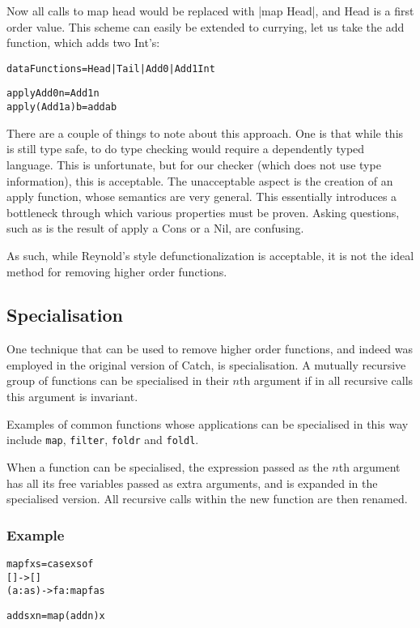 \documentclass[preprint]{sigplanconf}
\newcommand{\T}[1]{\texttt{#1}}
\newcommand{\C}[1]{\textsf{#1}}
\newcounter{exmp}
\newcommand{\yesexample}{\subsubsection*{Example \arabic{exmp}}\addtocounter{exmp}{1}}
\newenvironment{code}{\begin{alltt}\small}{\end{alltt}}
\begin{document}
Now all calls to map head would be replaced with |map Head|, and \C{Head} is a first order value. This scheme can easily be extended to currying, let us take the \C{add} function, which adds two \C{Int}'s:

\begin{code}
data Functions = Head | Tail | Add0 | Add1 Int

apply Add0 n = Add1 n
apply (Add1 a) b = add a b
\end{code}

There are a couple of things to note about this approach. One is that while this is still type safe, to do type checking would require a dependently typed language. This is unfortunate, but for our checker (which does not use type information), this is acceptable. The unacceptable aspect is the creation of an apply function, whose semantics are very general. This essentially introduces a bottleneck through which various properties must be proven. Asking questions, such as is the result of \C{apply} a \C{Cons} or a \C{Nil}, are confusing.

As such, while Reynold's style defunctionalization is acceptable, it is not the ideal method for removing higher order functions.

\subsection{Specialisation}

One technique that can be used to remove higher order functions, and indeed was employed in the original version of Catch, is specialisation. A mutually recursive group of functions can be specialised in their $n$th argument if in all recursive calls this
argument is invariant.

Examples of common functions whose applications can be specialised in this way include \T{map}, \T{filter}, \T{foldr} and \T{foldl}.

When a function can be specialised, the expression passed as the $n$th argument has all its free variables passed as extra arguments, and is expanded in the specialised version. All recursive calls within the new function are then renamed.

\yesexample

\begin{code}
map f xs = case xs of
                []     -> []
                (a:as) -> f a : map f as

adds x n = map (add n) x
\end{code}
\end{document}

